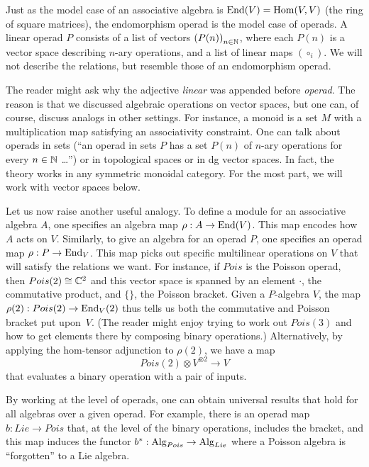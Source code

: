 \documentclass[11pt]{amsart}
\begin{document}
Just as the model case of an associative algebra is ${\rm End}(V) = {\rm Hom}(V,V)$ (the ring of square matrices),
the endomorphism operad is the model case of operads.
A linear operad $P$ consists of a list of vectors $\left(P(n) \right)_{n \in \mathbb N}$, where each $P(n)$ is a vector space describing $n$-ary operations, and a list of linear maps $\left(\circ_i\right)$.
We will not describe the relations, but resemble those of an endomorphism operad.

\begin{rmk}
The reader might ask why the adjective {\em linear} was appended before {\em operad}.
The reason is that we discussed algebraic operations on vector spaces,
but one can, of course, discuss analogs in other settings.
For instance, a monoid is a set $M$ with a multiplication map satisfying an associativity constraint.
One can talk about operads in sets (``an operad in sets $P$ has a set $P(n)$ of $n$-ary operations for every $n \in \mathbb N$ \dots'') or in topological spaces or in dg vector spaces.
In fact, the theory works in any symmetric monoidal category. 
For the most part, we will work with vector spaces below.
\end{rmk}

Let us now raise another useful analogy.
To define a module for an associative algebra $A$, one specifies an algebra map $\rho: A \to {\rm End}(V)$.
This map encodes how $A$ acts on $V$.
Similarly, to give an algebra for an operad $P$, one specifies an operad map $\rho: P \to {\rm End}_V$.
This map picks out specific multilinear operations on $V$ that will satisfy the relations we want.
For instance, if $Pois$ is the Poisson operad, then $Pois(2) \cong \mathbb C^2$ and this vector space is spanned by an element $\cdot$, the commutative product, and $\{\}$, the Poisson bracket.
Given a $P$-algebra $V$, the map $\rho(2): Pois(2) \to {\rm End}_V(2)$ thus tells us both the commutative and Poisson bracket put upon~$V$.
(The reader might enjoy trying to work out $Pois(3)$ and how to get elements there by composing binary operations.)
Alternatively, by applying the hom-tensor adjunction to $\rho(2)$, we have a map
\[
Pois(2) \otimes V^{\otimes 2} \to V
\]
that evaluates a binary operation with a pair of inputs.

By working at the level of operads, one can obtain universal results that hold for all algebras over a given operad.
For example, there is an operad map $b: Lie \to Pois$ that, at the level of the binary operations, includes the bracket, 
and this map induces the functor $b^*: {\rm Alg}_{Pois} \to {\rm Alg}_{Lie}$ where a Poisson algebra is ``forgotten'' to a Lie algebra.
\end{document}
